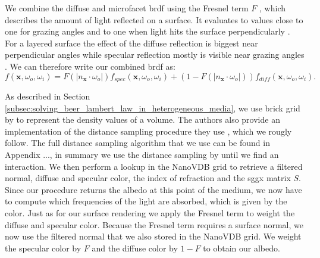We combine the diffuse and microfacet \ac{brdf} using the Fresnel term $F$ \cite{fresnel}, which describes the amount of light reflected on a surface.
It evaluates to values close to one for grazing angles and to one when light hits the surface perpendicularly \cite{pbr}.
For a layered surface the effect of the diffuse reflection is biggest near perpendicular angles while specular reflection mostly is visible near grazing angles \cite{pbr}.
We can therefore write our combined \ac{brdf} as:
\begin{equation*}
    f(\boldsymbol{x}, \omega_o, \omega_i) = F(|n_{\boldsymbol{x}} \cdot \omega_o|)f_{spec}(\boldsymbol{x}, \omega_o, \omega_i) + (1 - F(|n_{\boldsymbol{x}} \cdot \omega_o|))f_{diff}(\boldsymbol{x}, \omega_o, \omega_i).
\end{equation*}

As described in Section \ref{subsec:solving_beer_lambert_law_in_heterogeneous_media}, we use brick grid by \citeauthor{brick_grid} \cite{brick_grid} to represent the density values of a volume.
The authors also provide an implementation of the distance sampling procedure they use \cite{brick_grid}, which we rougly follow.
The full distance sampling algorithm that we use can be found in Appendix ..., in summary we use the distance sampling by \cite{brick_grid} until we find an interaction. %
We then perform a lookup in the NanoVDB grid to retrieve a filtered normal, diffuse and specular color, the index of refraction and the \ac{sggx} matrix $S$.
Since our procedure returns the albedo at this point of the medium, we now have to compute which frequencies of the light are absorbed, which is given by the color.
Just as for our surface rendering we apply the Fresnel term to weight the diffuse and specular color.
Because the Fresnel term requires a surface normal, we now use the filtered normal that we also stored in the NanoVDB grid.
We weight the specular color by $F$ and the diffuse color by $1-F$ to obtain our albedo.

